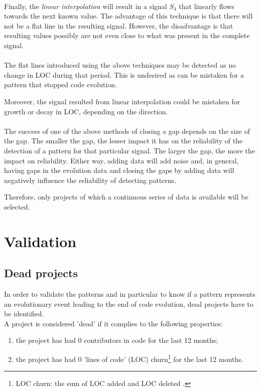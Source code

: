 \paragraph{}
Finally, the \textit{linear interpolation} will result in a signal $S_{4}$ that
linearly flows towards the next known value. The advantage of this technique is
that there will not be a flat line in the resulting signal. However, the
disadvantage is that resulting values possibly are not even close to what was
present in the complete signal.

\paragraph{}
The flat lines introduced using the above techniques may be detected as no
change in LOC during that period. This is undesired as can be mistaken for a
pattern that stopped code evolution.

Moreover, the signal resulted from linear interpolation could be mistaken for
growth or decay in LOC, depending on the direction.

\paragraph{}
The success of one of the above methods of closing a gap depends on the size of
the gap. The smaller the gap, the lesser impact it has on the reliability of
the detection of a pattern for that particular signal. The larger the gap, the
more the impact on reliability. Either way, adding data will add noise and, in
general, having gaps in the evolution data and closing the gaps by adding data
will negatively influence the reliability of detecting patterns.

Therefore, only projects of which a continuous series of data is available will
be selected.

\section{Validation}
\subsection{Dead projects}
\label{method:validation}
In order to validate the patterns and in particular to know if a pattern
represents an evolutionary event leading to the end of code evolution, dead
projects have to be identified.\\

\noindent
\label{def:dead}
A project is considered 'dead' if it complies to the following properties:
\begin{enumerate}
	\item the project has had 0 contributors in code for the last 12 months;
	\item the project has had 0 'lines of code' (LOC) churn\footnote{LOC churn:
	the sum of LOC added and LOC deleted \cite{elbaum}.} for the last 12 months.
\end{enumerate}

